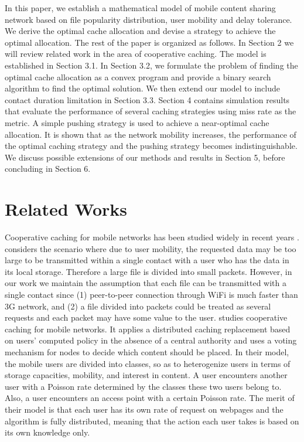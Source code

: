 \documentclass{sig-alternate}
\begin{document}
\vspace{1mm}

In this paper, we establish a mathematical model of mobile content sharing network based on file popularity distribution, user mobility and delay tolerance. We derive the optimal cache allocation and devise a strategy to achieve the optimal allocation. The rest of the paper is organized as follows. In Section 2 we will review related work in the area of cooperative caching. The model is established in Section 3.1. In Section 3.2, we formulate the problem of finding the optimal cache allocation as a convex program and provide a binary search algorithm to find the optimal solution. We then extend our model to include contact duration limitation in Section 3.3. Section 4 contains simulation results that evaluate the performance of several caching strategies using miss rate as the metric. A simple pushing strategy is used to achieve a near-optimal cache allocation. It is shown that as the network mobility increases, the performance of the optimal caching strategy and the pushing strategy becomes indistinguishable. We discuss possible extensions of our methods and results in Section 5, before concluding in Section 6.

\section{Related Works}
Cooperative caching for mobile networks has been studied widely in recent years \cite{zhuo2011social} \cite{zhuocontact} \cite{ioannidis2010distributed}. \cite{zhuo2011social} considers the scenario where due to user mobility, the requested data may be too large to be transmitted within a single contact with a user who has the data in its local storage. Therefore a large file is divided into small packets. However, in our work we maintain the assumption that each file can be transmitted with a single contact since (1) peer-to-peer connection through WiFi is much faster than 3G network, and (2) a file divided into packets could be treated as several requests and each packet may have some value to the user. \cite{ioannidis2010distributed} studies cooperative caching for mobile networks. It applies a distributed caching replacement based on users' computed policy in the absence of a central authority and uses a voting mechanism for nodes to decide which content should be placed. In their model, the mobile users are divided into classes, so as to heterogenize users in terms of storage capacities, mobility, and interest in content. A user encounters another user with a Poisson rate determined by the classes these two users belong to. Also, a user encounters an access point with a certain Poisson rate. The merit of their model is that each user has its own rate of request on webpages and the algorithm is fully distributed, meaning that the action each user takes is based on its own knowledge only. 
\end{document}

